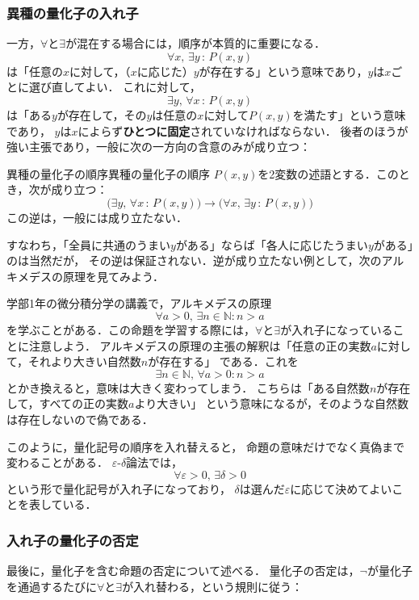 \subsubsection{異種の量化子の入れ子}
 
一方，$\forall$と$\exists$が混在する場合には，順序が本質的に重要になる．
\[
  \forall x,\, \exists y \, : \, P(x, y)
\]
は「任意の$x$に対して，（$x$に応じた）$y$が存在する」という意味であり，$y$は$x$ごとに選び直してよい．
これに対して，
\[
  \exists y,\, \forall x \, : \, P(x, y)
\]
は「ある$y$が存在して，その$y$は任意の$x$に対して$P(x, y)$を満たす」という意味であり，
$y$は$x$によらず\textbf{ひとつに固定}されていなければならない．
後者のほうが強い主張であり，一般に次の一方向の含意のみが成り立つ：
 
\begin{prop}{異種の量化子の順序}{異種の量化子の順序}
  $P(x, y)$を2変数の述語とする．このとき，次が成り立つ：
  \[
    \bigl( \exists y,\, \forall x \, : \, P(x, y) \bigr)
    \to
    \bigl( \forall x,\, \exists y \, : \, P(x, y) \bigr)
  \]
  この逆は，一般には成り立たない．
\end{prop}
 
すなわち，「全員に共通のうまい$y$がある」ならば「各人に応じたうまい$y$がある」のは当然だが，
その逆は保証されない．逆が成り立たない例として，次のアルキメデスの原理を見てみよう．
 
学部1年の微分積分学の講義で，アルキメデスの原理
\[
  \forall a>0,\, \exists n\in\mathbb{N} : n>a
\]
を学ぶことがある．この命題を学習する際には，$\forall$と$\exists$が入れ子になっていることに注意しよう．
アルキメデスの原理の主張の解釈は「任意の正の実数$a$に対して，それより大きい自然数$n$が存在する」
である．これを
\[
  \exists n\in\mathbb{N},\, \forall a>0 : n>a
\]
とかき換えると，意味は大きく変わってしまう．
こちらは「ある自然数$n$が存在して，すべての正の実数$a$より大きい」
という意味になるが，そのような自然数は存在しないので偽である．
 
このように，量化記号の順序を入れ替えると，
命題の意味だけでなく真偽まで変わることがある．
$\varepsilon$-$\delta$論法では，
\[
  \forall \varepsilon>0,\, \exists \delta>0
\]
という形で量化記号が入れ子になっており，
$\delta$は選んだ$\varepsilon$に応じて決めてよいことを表している．
 
\subsubsection{入れ子の量化子の否定}
 
最後に，量化子を含む命題の否定について述べる．
量化子の否定は，$\lnot$が量化子を通過するたびに$\forall$と$\exists$が入れ替わる，という規則に従う：
 
